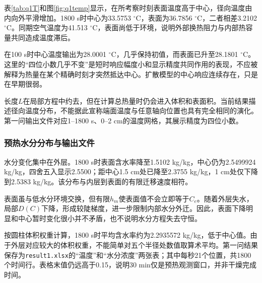 表\ref{tab:q1T}和图\ref{fig:q1temp}显示，在所考察时刻表面温度高于中心，径向温度由内向外平滑增加。1800 s时中心为33.5753 $^\circ$C，表面为36.7856 $^\circ$C，二者相差3.2102 $^\circ$C。同期空气温度为41.513 $^\circ$C，表面尚低于环境，说明外部换热阻力与内部热容量共同造成温度滞后。

在100 s时中心温度输出为28.0001 $^\circ$C，几乎保持初值，而表面已升至28.1801 $^\circ$C。这里的“四位小数几乎不变”是短时响应幅度小和显示精度共同作用的表现，不应被解释为热量在某个精确时刻才突然抵达中心。扩散模型的中心响应连续存在，只是在早期很弱。

长度$L$在局部方程中约去，但在计算总热量时仍会进入体积和表面积。当前结果描述径向温度分布，不能据此宣称端面温度与任意轴向位置也具有完全相同的演化。第一问输出文件对应1--1800 s、0--2 cm的温度网格，其展示精度为四位小数。

\nextpage
\subsubsection{预热水分分布与输出文件}


水分变化集中在外层。1800 s时表面含水率降至1.5102 kg/kg，中心仍为2.5499924 kg/kg，四舍五入显示2.5500；距中心1.5 cm处已降至2.3755 kg/kg，1 cm处仅下降到2.5383 kg/kg。该分布与内层到表面的有限迁移速度相符。

表面虽与低水分环境交换，但有限$h_m$使表面值不会立即等于$C_e$。随着外层失水，局部$D(C)$下降，形成较陡梯度，进一步限制内部水分外迁。因此，表面下降明显和中心暂时变化很小并不矛盾，也不说明水分方程失去守恒。

按圆柱体积权重计算，1800 s时平均含水率约为2.2935572 kg/kg，低于中心值。由于外层对应较大的体积权重，不能简单对五个半径处数值取算术平均。第一问结果保存为\texttt{result1.xlsx}的“温度”和“水分浓度”两张表；其中每秒21个位置，共1800个时间行。表格末值仍远高于0.15，说明30 min仅是预热观测窗口，并非干燥完成时间。
